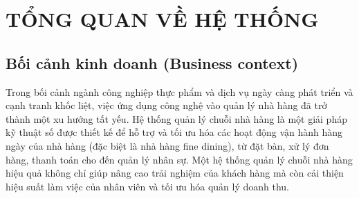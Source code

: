 \section{TỔNG QUAN VỀ HỆ THỐNG}

\subsection{Bối cảnh kinh doanh (Business context)}
Trong bối cảnh ngành công nghiệp thực phẩm và dịch vụ ngày càng phát triển và cạnh tranh khốc liệt, việc ứng dụng công nghệ vào quản lý nhà hàng đã trở thành một xu hướng tất yếu. Hệ thống quản lý chuỗi nhà hàng là một giải pháp kỹ thuật số được thiết kế để hỗ trợ và tối ưu hóa các hoạt động vận hành hàng ngày của nhà hàng (đặc biệt là nhà hàng fine dining), từ đặt bàn, xử lý đơn hàng, thanh toán cho đến quản lý nhân sự. Một hệ thống quản lý chuỗi nhà hàng hiệu quả không chỉ giúp nâng cao trải nghiệm của khách hàng mà còn cải thiện hiệu suất làm việc của nhân viên và tối ưu hóa quản lý doanh thu. 


